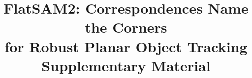 \documentclass[10pt,twocolumn,letterpaper]{article}
\title{FlatSAM2: Correspondences Name the Corners\\
for Robust Planar Object Tracking\\Supplementary Material}
\begin{document}
\maketitle


{
    \small
    
    
}
\end{document}
